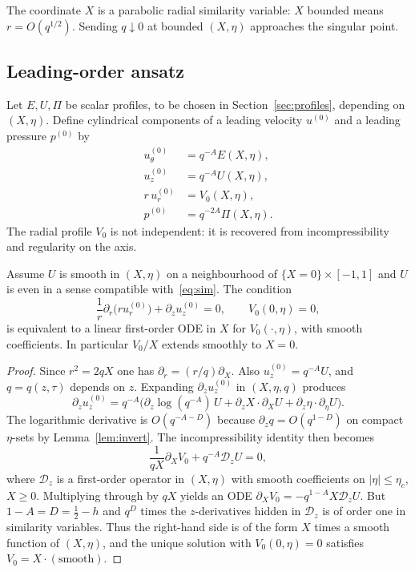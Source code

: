 The coordinate $X$ is a parabolic radial similarity variable: $X$ bounded means $r=O(q^{1/2})$. Sending $q\downarrow 0$ at bounded $(X,\eta)$ approaches the singular point.

\subsection{Leading-order ansatz}
\label{sec:ansatz}

\begin{construction}
\label{con:leading}
Let $E,U,\Pi$ be scalar profiles, to be chosen in Section~\ref{sec:profiles}, depending on $(X,\eta)$. Define cylindrical components of a leading velocity $u^{(0)}$ and a leading pressure $p^{(0)}$ by
\begin{equation}
\label{eq:leading}
\begin{aligned}
u^{(0)}_\theta &= q^{-A} E(X,\eta),\\
u^{(0)}_z &= q^{-A} U(X,\eta),\\
r\, u^{(0)}_r &= V_0(X,\eta),\\
p^{(0)} &= q^{-2A}\Pi(X,\eta).
\end{aligned}
\end{equation}
The radial profile $V_0$ is not independent: it is recovered from incompressibility and regularity on the axis.
\end{construction}

\begin{lemma}
\label{lem:V0}
Assume $U$ is smooth in $(X,\eta)$ on a neighbourhood of $\{X=0\}\times[-1,1]$ and $U$ is even in a sense compatible with~\eqref{eq:sim}. The condition
\[
\frac1r\partial_r\bigl(r u^{(0)}_r\bigr)+\partial_z u^{(0)}_z=0,
\qquad
V_0(0,\eta)=0,
\]
is equivalent to a linear first-order ODE in $X$ for $V_0(\cdot,\eta)$, with smooth coefficients. In particular $V_0/X$ extends smoothly to $X=0$.
\end{lemma}

\begin{proof}
Since $r^2=2qX$ one has $\partial_r= (r/q)\partial_X$. Also $u^{(0)}_z=q^{-A}U$, and $q=q(z,\tau)$ depends on $z$. Expanding $\partial_z u^{(0)}_z$ in $(X,\eta,q)$ produces
\[
\partial_z u^{(0)}_z
= q^{-A}\bigl( \partial_z\log(q^{-A})\, U + \partial_z X\cdot\partial_X U + \partial_z\eta\cdot\partial_\eta U\bigr).
\]
The logarithmic derivative is $O(q^{-A-D})$ because $\partial_z q = O(q^{1-D})$ on compact $\eta$-sets by Lemma~\ref{lem:invert}. The incompressibility identity then becomes
\[
\frac1{qX}\partial_X V_0 + q^{-A} \mathcal D_{z} U=0,
\]
where $\mathcal D_z$ is a first-order operator in $(X,\eta)$ with smooth coefficients on $|\eta|\le\eta_c$, $X\ge 0$. Multiplying through by $qX$ yields an ODE $\partial_X V_0 = -q^{1-A} X \mathcal D_z U$. But $1-A=D=\tfrac12-h$ and $q^{D}$ times the $z$-derivatives hidden in $\mathcal D_z$ is of order one in similarity variables. Thus the right-hand side is of the form $X$ times a smooth function of $(X,\eta)$, and the unique solution with $V_0(0,\eta)=0$ satisfies $V_0=X\cdot(\text{smooth})$.
\end{proof}

